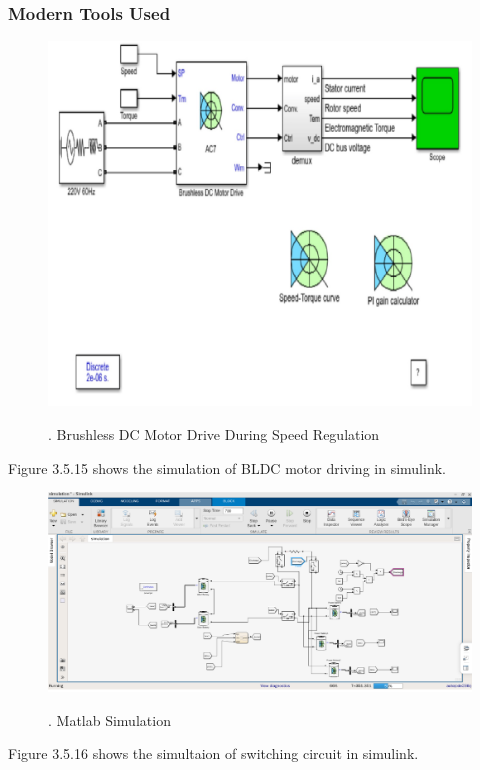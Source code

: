 \documentclass[a4paper,12pt]{article}
\begin{document}
\newpage
\subsubsection{Modern Tools Used}
\begin{figure}[!h]
\centering
\includegraphics[scale=0.3]{bl.jpg}\\
\caption{. Brushless DC Motor Drive During Speed Regulation}
\end{figure}
Figure 3.5.15 shows the simulation of BLDC motor driving in simulink.\\

\begin{figure}[!h]
\centering
\includegraphics[scale=0.3]{Sim.png}\\
\caption{. Matlab Simulation}
\end{figure}
Figure 3.5.16 shows the simultaion of switching circuit in simulink.\\
\end{document}
